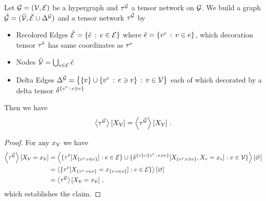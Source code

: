 \begin{lemma}
    \label{lem:deltification}
    Let $\mathcal{G}=(\mathcal{V},\mathcal{E})$ be a hypergraph and $\tau^{\mathcal{G}}$ a tensor network on $\mathcal{G}$.
    We build a graph $\tilde{\mathcal{G}}=(\tilde{\mathcal{V}},\tilde{\mathcal{E}}\cup\Delta^{\mathcal{G}})$ and a tensor network $\tau^{\tilde{\mathcal{G}}}$ by %
    \begin{itemize}
        \item Recolored Edges $\tilde{\mathcal{E}} = \{\tilde{e} \, : \, e\in \mathcal{E}\}$ where $\tilde{e} = \{v^{e} \, : \, v\in e\}$, which decoration tensor $\tau^{\tilde{e}}$ has same coordinates as $\tau^{e}$
        \item Nodes $\tilde{\mathcal{V}} = \bigcup_{e\in\mathcal{E}}\tilde{e}$ %
        \item Delta Edges $\Delta^{\mathcal{G}} =  \big\{ \{v\} \cup \{v^{e} \, : \, e\ni v \} \, : \, v\in\mathcal{V} \big\} $ each of which decorated by a delta tensor $\delta^{\{v^{e} \, : \, e\ni v \}}$
    \end{itemize}
    Then we have
    \begin{align*}
        \left\langle \tau^{\mathcal{G}}\right\rangle \left[ X_{\mathcal{V}} \right] =  \left\langle \tau^{\tilde{\mathcal{G}}}\right\rangle \left[ X_{\mathcal{V}} \right]  \, .
    \end{align*}
\end{lemma}
\begin{proof}
    For any $x_{\mathcal{V}}$ we have
    \begin{align*}
        \left\langle \tau^{\tilde{\mathcal{G}}}\right\rangle \left[ X_{\mathcal{V}}=x_{\mathcal{V}} \right]
        & = \left\langle \{\tau^{\tilde{e}}[X_{\{v^{e} : v\in e\}}] : e \in \mathcal{E} \}\cup
        \{\delta^{\{v\} \cup \{v^{e} \, : \, e\ni v \}}[X_{\{v^{e} : e\ni v \}}, X_{v}=x_{v} ]  : v\in\mathcal{V} \}
        \right\rangle \left[ \varnothing \right] \\
        & =  \left\langle \{\tau^{\tilde{e}}[X_{\{v^{e} : v\in e\}} = x_{\{v : v\in e\}} ] : e \in \mathcal{E} \}
        \right\rangle \left[ \varnothing \right] \\
        & = \left\langle \tau^{\mathcal{G}}\right\rangle \left[ X_{\mathcal{V}}=x_{\mathcal{V}} \right] \, ,
    \end{align*}
    which establishes the claim.
\end{proof}


